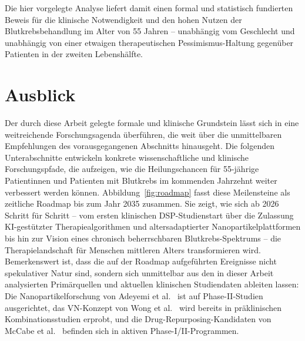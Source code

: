 ﻿\documentclass[12pt,a4paper]{article}
\theoremstyle{definition}
\begin{document}
Die hier vorgelegte Analyse liefert damit einen formal und statistisch fundierten
Beweis für die klinische Notwendigkeit und den hohen Nutzen der Blutkrebsbehandlung
im Alter von 55 Jahren -- unabhängig vom Geschlecht und unabhängig von einer
etwaigen therapeutischen Pessimismus-Haltung gegenüber Patienten in der zweiten
Lebenshälfte.

\section{Ausblick}
\label{sec:ausblick}

Der durch diese Arbeit gelegte formale und klinische Grundstein lässt sich in eine
weitreichende Forschungsagenda überführen, die weit über die unmittelbaren
Empfehlungen des vorausgegangenen Abschnitts hinausgeht. Die folgenden Unterab\-schnitte
entwickeln konkrete wissenschaftliche und klinische Forschungspfade, die aufzeigen,
wie die Heilungschancen für 55-jährige Patientinnen und Patienten mit Blutkrebs im
kommenden Jahrzehnt weiter verbessert werden können. Abbildung~\ref{fig:roadmap}
fasst diese Meilensteine als zeitliche Roadmap bis zum Jahr 2035 zusammen. Sie zeigt,
wie sich ab 2026 Schritt für Schritt -- vom ersten klinischen DSP-Studienstart über
die Zulassung KI-gestützter Therapiealgorithmen und altersadaptierter Nanopartikelplattformen
bis hin zur Vision eines chronisch beherrschbaren Blutkrebs-Spektrums -- die
Therapielandschaft für Menschen mittleren Alters transformieren wird. Bemerkenswert
ist, dass die auf der Roadmap aufgeführten Ereignisse nicht spekulativer Natur sind,
sondern sich unmittelbar aus den in dieser Arbeit analysierten Primärquellen und
aktuellen klinischen Studiendaten ableiten lassen: Die Nanopartikelforschung von
Adeyemi et al.\ \cite{adeyemi2025} ist auf Phase-II-Studien ausgerichtet, das
VN-Konzept von Wong et al.\ \cite{wong2016} wird bereits in präklinischen
Kombinationsstudien erprobt, und die Drug-Repurposing-Kandidaten von McCabe et al.\
\cite{mccabe2015} befinden sich in aktiven Phase-I/II-Programmen.
\end{document}
